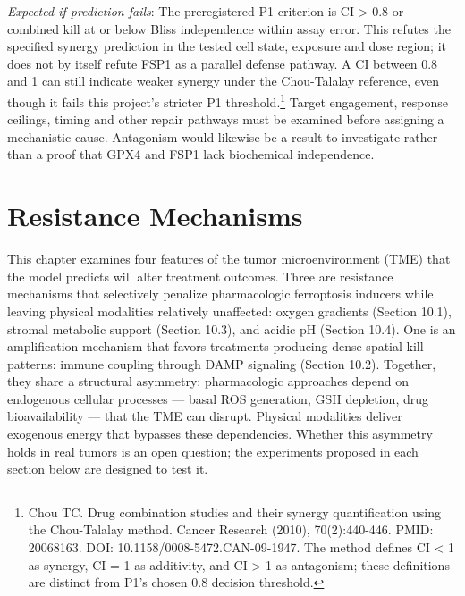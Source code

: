 \documentclass[11pt,twoside,openright]{report}
\begin{document}
\textit{Expected if prediction fails}: The preregistered P1 criterion is CI > 0.8 or combined kill at or below Bliss independence within assay error. This refutes the specified synergy prediction in the tested cell state, exposure and dose region; it does not by itself refute FSP1 as a parallel defense pathway. A CI between 0.8 and 1 can still indicate weaker synergy under the Chou-Talalay reference, even though it fails this project's stricter P1 threshold.\footnote{Chou TC. Drug combination studies and their synergy quantification using the Chou-Talalay method. Cancer Research (2010), 70(2):440-446. PMID: 20068163. DOI: 10.1158/0008-5472.CAN-09-1947. The method defines CI < 1 as synergy, CI = 1 as additivity, and CI > 1 as antagonism; these definitions are distinct from P1's chosen 0.8 decision threshold.} Target engagement, response ceilings, timing and other repair pathways must be examined before assigning a mechanistic cause. Antagonism would likewise be a result to investigate rather than a proof that GPX4 and FSP1 lack biochemical independence.

\chapter{Resistance Mechanisms}



This chapter examines four features of the tumor microenvironment (TME) that the model predicts will alter treatment outcomes. Three are resistance mechanisms that selectively penalize pharmacologic ferroptosis inducers while leaving physical modalities relatively unaffected: oxygen gradients (Section 10.1), stromal metabolic support (Section 10.3), and acidic pH (Section 10.4). One is an amplification mechanism that favors treatments producing dense spatial kill patterns: immune coupling through DAMP signaling (Section 10.2). Together, they share a structural asymmetry: pharmacologic approaches depend on endogenous cellular processes --- basal ROS generation, GSH depletion, drug bioavailability --- that the TME can disrupt. Physical modalities deliver exogenous energy that bypasses these dependencies. Whether this asymmetry holds in real tumors is an open question; the experiments proposed in each section below are designed to test it.
\end{document}
